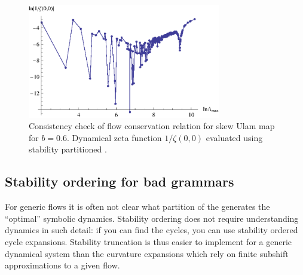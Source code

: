 \begin{figure}
\begin{center}
	\includegraphics[width=0.75\textwidth]{figs/skewUlamZeta.eps}
\end{center}
\caption{
    {\small
Consistency check of flow conservation relation  
for skew Ulam map   for $b=0.6$. 
Dynamical zeta function $1/\zeta(0,0)$ evaluated using stability 
partitioned \statesp.
	}}
\label{fig:zetaStabOrder1}
\end{figure}

\subsection{Stability ordering for bad grammars}

For generic flows it is often not clear what
partition of the {\statesp} generates the ``optimal''
symbolic dynamics.  Stability ordering
does not require understanding dynamics in such detail:
if you can find the cycles, you can use
stability ordered cycle expansions.
Stability truncation
is thus
easier to implement for
a generic dynamical system than the
curvature expansions
which rely on finite subshift approximations
to a given flow.

